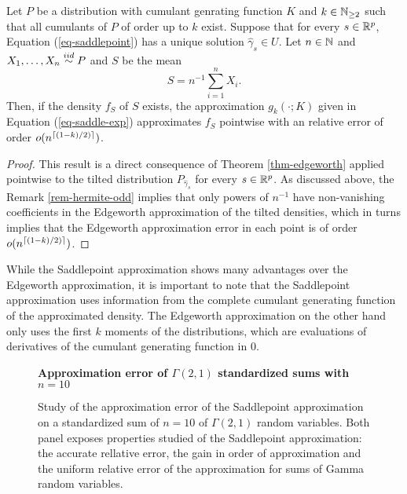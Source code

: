 \begin{theorem}
    Let $P$ be a distribution with cumulant genrating function $K$ and $k \in \mathbb{N}_{\geq 2}$ such that all cumulants of $P$ of order up to $k$ exist. Suppose that for every $s \in {\mathbb{R}^p}$, Equation (\ref{eq-saddlepoint}) has a unique solution $\hat\gamma_s \in U$. Let $n \in \mathbb{N}$ and $X_1, \ldots, X_n \stackrel{iid}{\sim} P$ and $S$ be the mean
    \begin{equation*}
        S = n^{-1} \sum_{i=1}^n X_i.
    \end{equation*}
    Then, if the density $f_S$ of $S$ exists, the approximation $g_k(\cdot; K)$ given in Equation (\ref{eq-saddle-exp}) approximates $f_S$ pointwise with an relative error of order $o(n^{\lceil(1-k)/2)\rceil})$.
\end{theorem}
\begin{proof}
    This result is a direct consequence of Theorem \ref{thm-edgeworth} applied pointwise to the tilted distribution $P_{\hat\gamma_s}$ for every $s \in {\mathbb{R}^p}$. As discussed above, the Remark \ref{rem-hermite-odd} implies that only powers of $n^{-1}$ have non-vanishing coefficients in the Edgeworth approximation of the tilted densities, which in turns implies that the Edgeworth approximation error in each point is of order $o(n^{\lceil(1-k)/2)\rceil})$.
\end{proof}

While the Saddlepoint approximation shows many advantages over the Edgeworth approximation, it is important to note that the Saddlepoint approximation uses information from the complete cumulant generating function of the approximated density. The Edgeworth approximation on the other hand only uses the first $k$ moments of the distributions, which are evaluations of derivatives of the cumulant generating function in 0. 

\begin{figure}[h]
    \textbf{Approximation error of $\Gamma(2,1)$ standardized sums with $n=10$}
    \centering
    \caption{Study of the approximation error of the Saddlepoint approximation on a standardized sum of $n=10$ of $\Gamma(2, 1)$ random variables. Both panel exposes properties studied of the Saddlepoint approximation: the accurate rellative error, the gain in order of approximation and the uniform relative error of the approximation for sums of Gamma random variables.}
    \label{fig-saddlepoint-err}
\end{figure}


